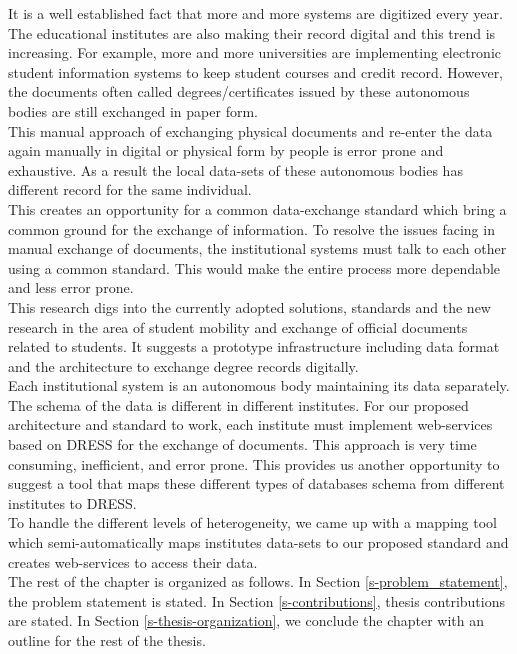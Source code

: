 \documentclass[12pt,a4paper,oneside]{book}
\begin{document}
It is a well established fact that more and more systems are digitized every year. The educational institutes are also making their record digital and this trend is increasing. For example, more and more universities are implementing electronic student information systems to keep student courses and credit record. However, the documents often called degrees/certificates issued by these autonomous bodies are still exchanged in paper form.  \\

This manual approach of exchanging physical documents and re-enter the data again manually in digital or physical form by people is error prone and exhaustive. As a result the local data-sets of these autonomous bodies has different record for the same individual. \\

This creates an opportunity for a common data-exchange standard which bring a common ground for the exchange of information. To resolve the issues facing in manual exchange of documents, the institutional systems must talk to each other using a common standard. This would make the entire process more dependable and less error prone. \\

This research digs into the currently adopted solutions, standards and the new research in the area of student mobility and exchange of official documents related to students. It suggests a prototype infrastructure including data format and the architecture to exchange degree records digitally. \\

Each institutional system is an autonomous body maintaining its data separately. The schema of the data is different in different institutes. For our proposed architecture and standard to work, each institute must  implement web-services based on DRESS for the exchange of documents. This approach is very time consuming, inefficient, and error prone. This provides us another  opportunity to suggest a tool that maps these different types of databases schema from different institutes to DRESS. \\

To handle the different levels of heterogeneity, we came up with a mapping tool which semi-automatically maps institutes data-sets to our proposed standard and creates web-services to access their data. \\

The rest of the chapter is organized as follows. In Section \ref{s-problem_statement}, the problem statement is stated. In Section \ref{s-contributions}, thesis contributions are stated. In Section \ref{s-thesis-organization}, we conclude the chapter with an outline for the rest of the thesis. \\
\end{document}
